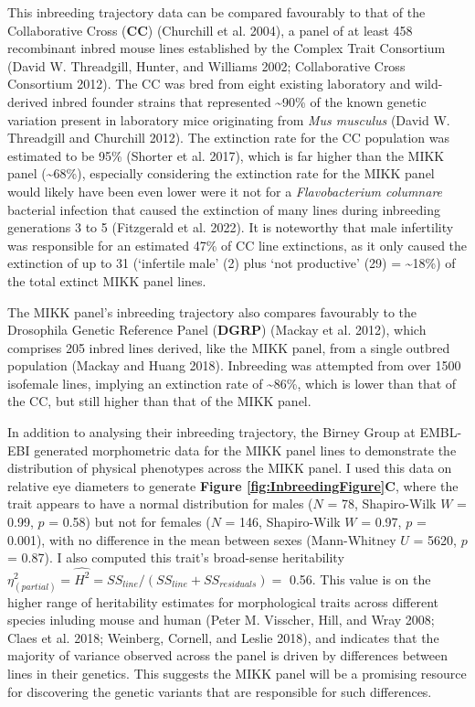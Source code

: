 \documentclass[
]{book}
\begin{document}
This inbreeding trajectory data can be compared favourably to that of the Collaborative Cross (\textbf{CC}) (Churchill et al. 2004), a panel of at least 458 recombinant inbred mouse lines established by the Complex Trait Consortium (David W. Threadgill, Hunter, and Williams 2002; Collaborative Cross Consortium 2012). The CC was bred from eight existing laboratory and wild-derived inbred founder strains that represented \textasciitilde90\% of the known genetic variation present in laboratory mice originating from \emph{Mus musculus} (David W. Threadgill and Churchill 2012). The extinction rate for the CC population was estimated to be 95\% (Shorter et al. 2017), which is far higher than the MIKK panel (\textasciitilde68\%), especially considering the extinction rate for the MIKK panel would likely have been even lower were it not for a \emph{Flavobacterium columnare} bacterial infection that caused the extinction of many lines during inbreeding generations 3 to 5 (Fitzgerald et al. 2022). It is noteworthy that male infertility was responsible for an estimated 47\% of CC line extinctions, as it only caused the extinction of up to 31 (`infertile male' (2) plus `not productive' (29) = \textasciitilde18\%) of the total extinct MIKK panel lines.

The MIKK panel's inbreeding trajectory also compares favourably to the Drosophila Genetic Reference Panel (\textbf{DGRP}) (Mackay et al. 2012), which comprises 205 inbred lines derived, like the MIKK panel, from a single outbred population (Mackay and Huang 2018). Inbreeding was attempted from over 1500 isofemale lines, implying an extinction rate of \textasciitilde86\%, which is lower than that of the CC, but still higher than that of the MIKK panel.

In addition to analysing their inbreeding trajectory, the Birney Group at EMBL-EBI generated morphometric data for the MIKK panel lines to demonstrate the distribution of physical phenotypes across the MIKK panel. I used this data on relative eye diameters to generate \textbf{Figure \ref{fig:InbreedingFigure}C}, where the trait appears to have a normal distribution for males (\(N\) = 78, Shapiro-Wilk \(W\) = 0.99, \(p\) = 0.58) but not for females (\(N\) = 146, Shapiro-Wilk \(W\) = 0.97, \(p\) = 0.001), with no difference in the mean between sexes (Mann-Whitney \(U\) = 5620, \(p\) = 0.87). I also computed this trait's broad-sense heritability \(\eta^2_{(partial)} = \hat{H^2} = SS_{line} / (SS_{line} + SS_{residuals}) =\) 0.56. This value is on the higher range of heritability estimates for morphological traits across different species inluding mouse and human (Peter M. Visscher, Hill, and Wray 2008; Claes et al. 2018; Weinberg, Cornell, and Leslie 2018), and indicates that the majority of variance observed across the panel is driven by differences between lines in their genetics. This suggests the MIKK panel will be a promising resource for discovering the genetic variants that are responsible for such differences.
\end{document}
